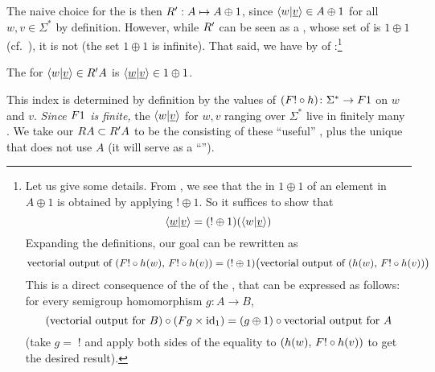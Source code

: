 The naive choice for the  is then $\functorr' : A \mapsto A
\oplus 1$, since $\langle w|\underline{v} \rangle \in A\oplus1$ for all $w,v\in\Sigma^*$
by definition. However, while $\functorr'$ can be seen as a , whose set of  is $1 \oplus 1$
(cf.~), it is not  (the set $1\oplus1$ is infinite). That said, we have by
 of :\footnote{Let us give some details. From , we see that the  in $1 \oplus 1$ of an element in $A \oplus 1$ is obtained by applying $!\oplus1$. So it suffices to show that
  \[\langle \underline{w}|\underline{v} \rangle = (!\oplus1)(\langle w|\underline{v} \rangle) \]
  Expanding the definitions, our goal can be rewritten as
  \[ \text{vectorial output of}\ (\functor! \circ h(w),\, \functor! \circ h(v)) = (!\oplus1)\big(\text{vectorial output of}\ (h(w),\, \functor! \circ h(v))\big) \]
  This is a direct consequence of the  of the , that can be expressed as follows: for every semigroup homomorphism $g\colon A \to B$,
  \[ (\text{vectorial output for $B$}) \circ (\functor g \times \mathrm{id}_1) = (g\oplus1) \circ \text{vectorial output for $A$} \]
  (take $g=\;!$ and apply both sides of the equality to $(h(w),\, \functor! \circ h(v))$ to get the desired result).}
\begin{claim}\label{clm:component-index}
  The  for $\tuple{w|\underline{v}} \in \functorr'A$ is $\langle \underline{w}|\underline{v} \rangle \in 1 \oplus 1$.
\end{claim}
This index is determined by definition by the values of $(\functor! \circ h) \colon \Sigma^* \to \functor1$ on $w$ and $v$. \emph{Since $\functor1$ is finite,} the $\langle w|\underline{v} \rangle$ for $w,v$ ranging over $\Sigma^*$ live in finitely many . We take our   $\functorr A \subset \functorr' A$ to be the  consisting of these \enquote{useful} , plus the unique  that does not use $A$ (it will serve as a \enquote{}).

